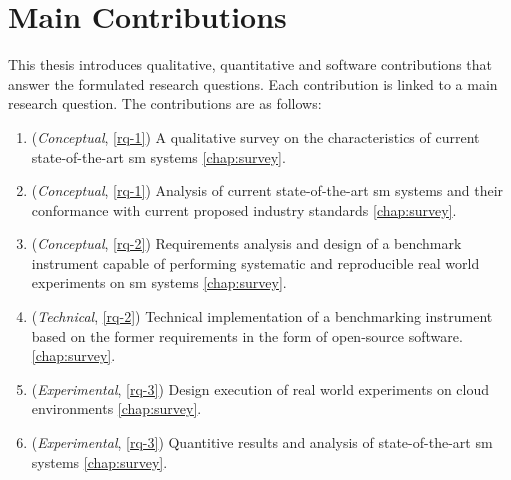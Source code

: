 \section{Main Contributions}
\label{sec:contributions}

This thesis introduces qualitative, quantitative and software contributions that answer the formulated research questions. Each contribution is linked to a main research question. The contributions are as follows:



\begin{enumerate}
    \item (\textit{Conceptual}, \ref{rq-1}) A qualitative survey on the characteristics of current state-of-the-art \gls{sm} systems \cref{chap:survey}.
    
    \item (\textit{Conceptual}, \ref{rq-1}) Analysis of current state-of-the-art \gls{sm} systems and their conformance with current proposed industry standards \cref{chap:survey}.    
    
    
    \item (\textit{Conceptual}, \ref{rq-2}) Requirements analysis and design of a benchmark instrument capable of performing systematic and reproducible real world experiments on \gls{sm} systems \cref{chap:survey}.  
    
    \item (\textit{Technical}, \ref{rq-2}) Technical implementation of a benchmarking instrument based on the former requirements in the form of open-source software. \cref{chap:survey}.


    \item (\textit{Experimental}, \ref{rq-3}) Design execution of real world experiments on cloud environments \cref{chap:survey}.
    
    \item (\textit{Experimental}, \ref{rq-3}) Quantitive results and analysis of state-of-the-art \gls{sm} systems \cref{chap:survey}.
\end{enumerate}


 
